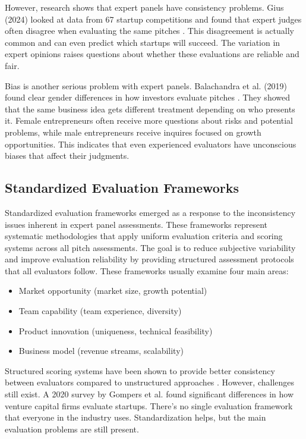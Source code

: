However, research shows that expert panels have consistency problems. Gius (2024) looked at data from 67 startup competitions and found that expert judges often disagree when evaluating the same pitches \cite{Gius2024}. This disagreement is actually common and can even predict which startups will succeed. The variation in expert opinions raises questions about whether these evaluations are reliable and fair.

Bias is another serious problem with expert panels. Balachandra et al. (2019) found clear gender differences in how investors evaluate pitches \cite{Balachandra2019}. They showed that the same business idea gets different treatment depending on who presents it. Female entrepreneurs often receive more questions about risks and potential problems, while male entrepreneurs receive inquires focused on growth opportunities. This indicates that even experienced evaluators have unconscious biases that affect their judgments.

\clearpage
\subsection{Standardized Evaluation Frameworks}\label{subsec:standardized-frameworks}
Standardized evaluation frameworks emerged as a response to the inconsistency issues inherent in expert panel assessments. These frameworks represent systematic methodologies that apply uniform evaluation criteria and scoring systems across all pitch assessments. The goal is to reduce subjective variability and improve evaluation reliability by providing structured assessment protocols that all evaluators follow.
These frameworks usually examine four main areas:
\begin{itemize}
    \item Market opportunity (market size, growth potential)
    \item Team capability (team experience, diversity)
    \item Product innovation (uniqueness, technical feasibility)
    \item Business model (revenue streams, scalability)
\end{itemize}

Structured scoring systems have been shown to provide better consistency between evaluators compared to unstructured approaches \cite{Tsay2021VISUALSDI}. However, challenges still exist. A 2020 survey by Gompers et al.\cite{Gompers2020} found significant differences in how venture capital firms evaluate startups. There's no single evaluation framework that everyone in the industry uses. Standardization helps, but the main evaluation problems are still present.

